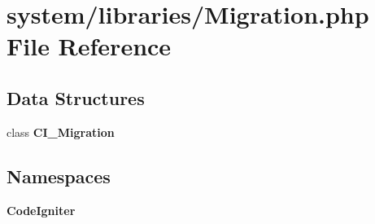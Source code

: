 \section{system/libraries/\-Migration.php File Reference}
\label{system_2libraries_2migration_8php}
\subsection*{Data Structures}
\begin{DoxyCompactItemize}
\item 
class {\bf C\-I\-\_\-\-Migration}
\end{DoxyCompactItemize}
\subsection*{Namespaces}
\begin{DoxyCompactItemize}
\item 
{\bf Code\-Igniter}
\end{DoxyCompactItemize}

